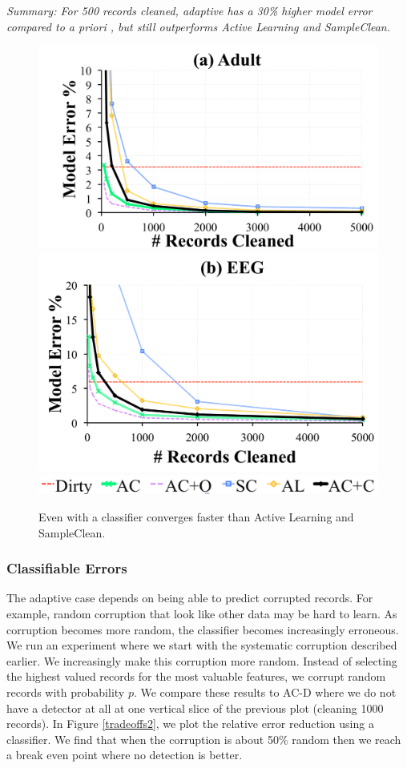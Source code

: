 \vspace{0.25em}

\noindent \emph{Summary: For 500 records cleaned, adaptive \sys has a 30\% higher model error compared to a priori \sys, but still outperforms Active Learning and SampleClean.}

\begin{figure}[t]
\centering\vspace{-1em}
 \includegraphics[width=0.49\columnwidth]{exp/exp11a.pdf}
 \includegraphics[width=0.49\columnwidth]{exp/exp11b.pdf}
 \includegraphics[width=0.49\columnwidth]{exp/legend-11.png}\vspace{-0.5em}
 \caption{Even with a classifier \sys converges faster than Active Learning and SampleClean. \label{pred-perf}}\vspace{-1.0em}
\end{figure}


\subsubsection{Classifiable Errors}
The adaptive case depends on being able to predict corrupted records.
For example, random corruption that look like other data may be hard to learn.
As corruption becomes more random, the classifier becomes increasingly erroneous.
We run an experiment where we start with the systematic corruption described earlier.
We increasingly make this corruption more random.
Instead of selecting the highest valued records for the most valuable features, we corrupt random records with probability $p$. 
We compare these results to AC-D where we do not have a detector at all at one vertical slice of the previous plot (cleaning 1000 records).
In Figure \ref{tradeoffs2}, we plot the relative error reduction using a classifier.
We find that when the corruption is about 50\% random then we reach a break even point where no detection is better.

